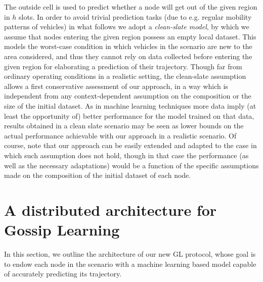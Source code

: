 \documentclass[conference]{IEEEtran}
\begin{document}
The outside cell is used to predict whether a node will get out of the given region in $h$ slots. In order to avoid trivial prediction tasks (due to e.g. regular mobility patterns of vehicles) in what follows we adopt a \textit{clean-slate model}, by which we assume that nodes entering the given region possess an empty local dataset. This models the worst-case condition in which vehicles in the scenario are new to the area considered, and thus they cannot rely on data collected before entering the given region for elaborating a prediction of their trajectory. Though far from ordinary operating conditions in a realistic setting, the clean-slate assumption allows a first conservative assessment of our approach, in a way which is independent from any context-dependent assumption on the composition or the size of the initial dataset. As in machine learning techniques more data imply (at least the opportunity of) better performance for the model trained on that data, results obtained in a clean slate scenario may be seen as lower bounds on the actual performance achievable with our approach in a realistic scenario.
Of course, note that our approach can be easily extended and adapted to the case in which such assumption does not hold, though in that case the performance (as well as the necessary adaptations) would be a function of the specific assumptions made on the composition of the initial dataset of each node. 
\vspace{-5pt}
\section{A distributed architecture for Gossip Learning}
\label{sec:A distributed architecture for Gossip Learning}
In this section, we outline the architecture of our new GL protocol, whose goal is to endow each node in the scenario with a machine learning based model capable of accurately predicting its trajectory. 
\vspace{-0.1in}
\end{document}
